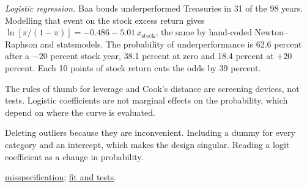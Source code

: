 \begin{qfmethod}
\emph{Logistic regression.} Baa bonds underperformed Treasuries in 31 of the 98 years. Modelling that event on the stock excess return gives $\ln[\pi/(1-\pi)]=-0.486-5.01\,x_{\text{stock}}$, the same by hand-coded Newton--Raphson and statsmodels. The probability of underperformance is 62.6 percent after a $-20$ percent stock year, 38.1 percent at zero and 18.4 percent at $+20$ percent. Each 10 points of stock return cuts the odds by 39 percent.

 The rules of thumb for leverage and Cook's distance are screening devices, not tests. Logistic coefficients are not marginal effects on the probability, which depend on where the curve is evaluated.

 Deleting outliers because they are inconvenient. Including a dummy for every category and an intercept, which makes the design singular. Reading a logit coefficient as a change in probability.

 \hyperref[meth:regression-misspecification]{misspecification}; \hyperref[meth:multiple-regression-fit-tests]{fit and tests}.

\end{qfmethod}
